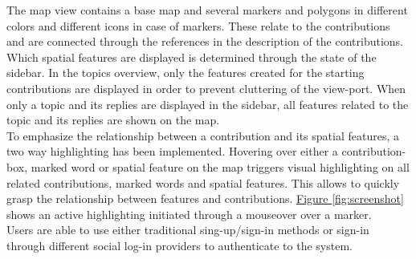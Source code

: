 The map view contains a base map and several markers and polygons in different colors and different icons in case of markers. These relate to the contributions and are connected through the references in the description of the contributions. Which spatial features are displayed is determined through the state of the sidebar. In the topics overview, only the features created for the starting contributions are displayed in order to prevent cluttering of the view-port. When only a topic and its replies are displayed in the sidebar, all features related to the topic and its replies are shown on the map. \\
To emphasize the relationship between a contribution and its spatial features, a two way highlighting has been implemented. Hovering over either a contribution-box, marked word or spatial feature on the map triggers visual highlighting on all related contributions, marked words and spatial features. This allows to quickly grasp the relationship between features and contributions. \hyperref[fig:screenshot]{Figure \ref{fig:screenshot}} shows an active highlighting initiated through a mouseover over a marker.\\
Users are able to use either traditional sing-up/sign-in methods or sign-in through different social log-in providers to authenticate to the system.



